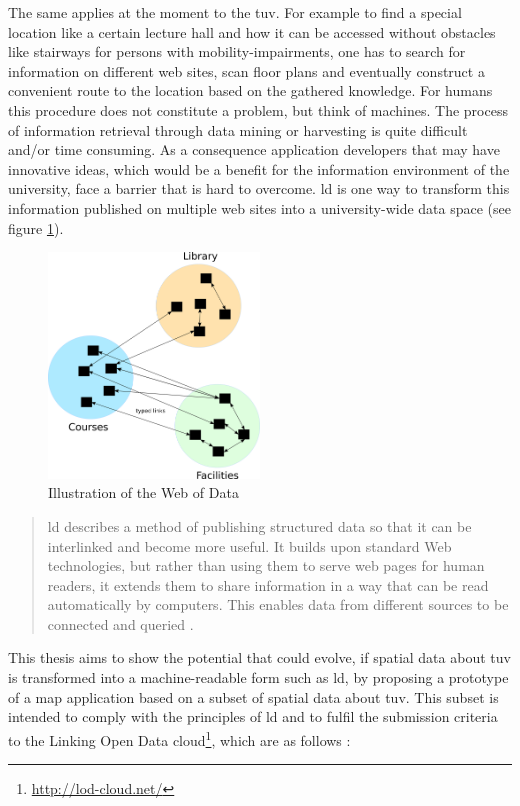 \documentclass[draft,final]{vutinfth} %
\begin{document}
The same applies at the moment to the \gls{tuv}. For example to find a special location like a certain lecture hall and how it can be accessed without obstacles like stairways for persons with mobility-impairments, one has to search for information on different web sites, scan floor plans and eventually construct a convenient route to the location based on the gathered knowledge. For humans this procedure does not constitute a problem, but think of machines. The process of information retrieval through data mining or harvesting is quite difficult and/or time consuming. As a consequence application developers that may have innovative ideas, which would be a benefit for the information environment of the university, face a barrier that is hard to overcome. \gls{ld} is one way to transform this information published on multiple web sites into a university-wide data space (see figure \ref{fig:motiviation-web-of-data}).

\begin{figure}[h]
    \centering    
    \includegraphics[width=0.5\textwidth]{graphics/webOfData.png}
    \caption{Illustration of the Web of Data}
    \label{fig:motiviation-web-of-data}
\end{figure}

\begin{quote} \gls{ld} describes a method of publishing structured data so that it can be interlinked and become more useful. It builds upon standard Web technologies, but rather than using them to serve web pages for human readers, it extends them to share information in a way that can be read automatically by computers. This enables data from different sources to be connected and queried
\cite{bizer_linked_2009}.\end{quote}

This thesis aims to show the potential that could evolve, if spatial data about \gls{tuv} is transformed into a machine-readable form such as \gls{ld}, by proposing a prototype of a map application based on a subset of spatial data about \gls{tuv}. This subset is intended to comply with the principles of \gls{ld} \cite{berners-lee_linked_2009} and to fulfil the submission criteria to the Linking Open Data cloud\footnote{\url{http://lod-cloud.net/}}, which are as follows \cite{cyganiak_linking_2011}:
\end{document}
